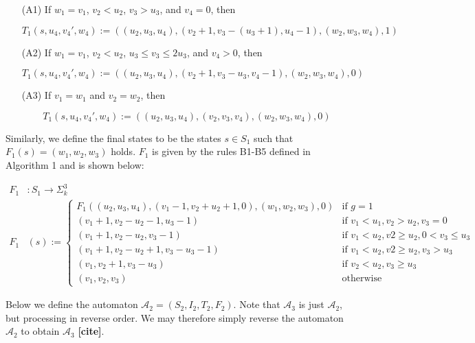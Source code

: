 \documentclass[a4paper]{article}
\newcommand{\reed}[1]{{\color{magenta}\bfseries [#1]}}
\theoremstyle{definition}
\theoremstyle{remark}
\theoremstyle{remark}
\theoremstyle{plain}
\begin{document}
\begin{itemize}
    \item[(A1)] If $w_1 = v_1$, $v_2 < u_2$, $v_3 > u_3$, and $v_4 = 0$, then 
    
    $$T_1(s,u_4,v_4',w_4) := ((u_2,u_3,u_4),(v_2 + 1, v_3-(u_3+1),u_4-1),(w_2,w_3,w_4),1)$$
    
    \item[(A2)] If $w_1 = v_1$, $v_2 < u_2$, $u_3 \leq v_3 \leq 2u_3$, and $v_4 > 0$, then
    
    $$T_1(s,u_4,v_4',w_4) := ((u_2,u_3,u_4),(v_2+1,v_3-u_3,v_4-1),(w_2,w_3,w_4),0)$$
    
    \item[(A3)] If $v_1 = w_1$ and $v_2 = w_2$, then
    
    $$T_1(s,u_4,v_4',w_4) := ((u_2,u_3,u_4),(v_2,v_3,v_4),(w_2,w_3,w_4),0)$$
\end{itemize}

Similarly, we define the final states to be the states $s \in S_1$ such that $F_1(s) = (w_1,w_2,w_3)$ holds.
$F_1$ is given by the rules B1-B5 defined in Algorithm 1 and is shown below:

\begin{equation*}\label{def:alg1-final-func}
\begin{split}
    F_1&: S_1 \rightarrow \Sigma_k^3\\
    F_1&(s) := 
    \begin{cases}
        F_1((u_2,u_3,u_4),(v_1 - 1, v_2 + u_2 + 1, 0),(w_1,w_2,w_3),0) & \text{if } g = 1\\
        (v_1 + 1,v_2-u_2-1,u_3-1) & \text{if } v_1 < u_1,v_2 > u_2, v_3 = 0\\
        (v_1 + 1, v_2 - u_2, v_3 - 1) & \text{if } v_1 < u_2, v2 \geq u_2, 0 < v_3 \leq u_3\\
        (v_1 + 1, v_2 - u_2 + 1, v_3 - u_3 - 1) & \text{if } v_1 < u_2, v2 \geq u_2, v_3 > u_3\\
        (v_1, v_2 + 1, v_3 - u_3) & \text{if } v_2 < u_2, v_3 \geq u_3\\
        (v_1,v_2,v_3) & \text{otherwise}
    \end{cases}
\end{split}
\end{equation*}

Below we define the automaton $\mathcal{A}_2 = (S_2, I_2, T_2, F_2)$.
Note that $\mathcal{A}_3$ is just $\mathcal{A}_2$, but processing in reverse order.
We may therefore simply reverse the automaton $\mathcal{A}_2$ to obtain $\mathcal{A}_3$ \reed{cite}.
\end{document}
